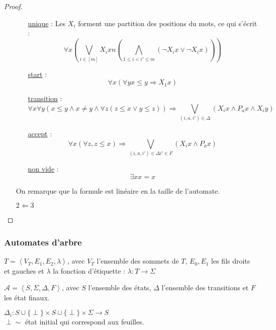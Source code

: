\documentclass[a4paper, 11pt]{thesis}
\begin{document}
\begin{proof}
\begin{itemize}
            \begin{itemize}
                \item[\underline{unique} :] Les $X_i$ forment une partition des positions du mots, ce qui
                    s'écrit : \[
                        \forall x \left ( \bigvee_{i \in [m]} X_i x n ( \bigwedge_{1 \leq i < i' \leq m}
                        (\neg X_i x \vee \neg X_i x )) \right )
                    \]
                \item[\underline{start} :] \[
                        \forall x ( \forall y x \leq y \Rightarrow X_1 x )
                    \]
                \item[\underline{transition} :] \[
                        \forall x \forall y \left ( x \leq y \wedge x \neq y \wedge \forall z ( z
                        \leq x \vee y \leq z)\right ) \Rightarrow \bigvee_{(i, a, i') \in \Delta} (X_i x
                        \wedge P_a x \wedge X_i y )
                    \]
                \item[\underline{accept} :] \[
                        \forall x \left ( \forall z, z \leq x\right ) \Rightarrow \bigvee_{(i, a, i') \in
                        \Delta i' \in F} (X_i x \wedge P_a x)
                    \]
                \item[\underline{non vide} :] \[
                        \exists x x=x
                    \]
            \end{itemize}
            On remarque que la formule est linéaire en la taille de l'automate.
        \item[$2 \Leftarrow 3$] %
    \end{itemize}
\end{proof}

\subsubsection{Automates d'arbre}

\begin{df}
    $T = \left < V_T, E_1, E_2, \lambda \right >$, avec $V_T$ l'ensemble des sommets de $T$, $E_0,
    E_1$ les fils droits et gauches et $\lambda$ la fonction d'étiquette : $\lambda : T
    \longrightarrow \Sigma$
\end{df}


\begin{df}
    $\mathcal{A} = \left < S, \Sigma, \Delta, F \right >$, avec $S$ l'ensemble des états, $\Delta$
    l'ensemble des transitions et $F$ les état finaux.

    $\Delta_i : S \cup \{ \perp\} \times S \cup \{\perp\} \times \Sigma \longrightarrow S$ \\
    $\perp \sim $ état initial qui correspond aux feuilles.
\end{df}
\end{document}
